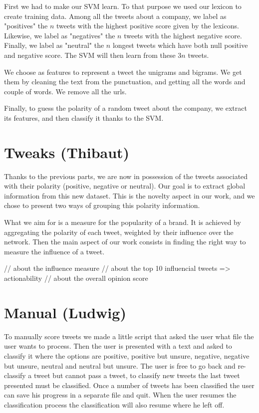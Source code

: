 \documentclass[a4paper,11pt]{report}
\begin{document}
First we had to make our SVM learn. To that purpose we used our lexicon to create training data. Among all the tweets about a company, we label as "positives" the $n$ tweets with the highest positive score given by the lexicons. Likewise, we label as "negatives" the $n$ tweets with the highest negative score. Finally, we label as "neutral" the $n$ longest tweets which have both null positive and negative score. The SVM will then learn from these $3n$ tweets.

We choose as features to represent a tweet the unigrams and bigrams. We get them by cleaning the text from the punctuation, and getting all the words and couple of words. We remove all the urls.

Finally, to guess the polarity of a random tweet about the company, we extract its features, and then classify it thanks to the SVM.

\section{Tweaks (Thibaut)}

Thanks to the previous parts, we are now in possession of the tweets associated with their polarity (positive, negative or neutral). Our goal is to extract global information from this new dataset.
This is the novelty aspect in our work, and we chose to present two ways of grouping this polarity information.

What we aim for is a measure for the popularity of a brand. It is achieved by aggregating the polarity of each tweet, weighted by their influence over the network.
Then the main aspect of our work consists in finding the right way to measure the influence of a tweet.

// about the influence measure
// about the top 10 influencial tweets => actionability
// about the overall opinion score

\section{Manual (Ludwig)}
To manually score tweets we made a little script that asked the user what file the user wants to process. 
Then the user is presented with a text and asked to classify it where the options are positive, positive but unsure, negative, negative but unsure, neutral and neutral but unsure. 
The user is free to go back and re-classify a tweet but cannot pass a tweet, to classify new tweets the last tweet presented must be classified. 
Once a number of tweets has been classified the user can save his progress in a separate file and quit. 
When the user resumes the classification process the classification will also resume where he left off.
\end{document}
